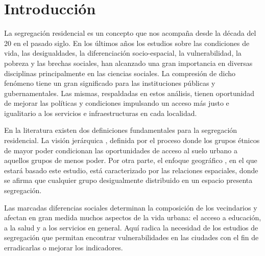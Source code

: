 \chapter*{Introducción}\label{chapter:introduction}

La segregación residencial es un concepto que nos acompaña desde la década del 20 en el pasado siglo. En los últimos años los estudios sobre las condiciones de vida, las desigualdades, la diferenciación socio-espacial, la vulnerabilidad, la pobreza y las brechas sociales, han alcanzado una gran importancia en diversas disciplinas principalmente en las ciencias sociales. La compresión de dicho fenómeno tiene un gran significado para las instituciones públicas y gubernamentales. Las mismas, respaldadas en estos análisis, tienen oportunidad de mejorar las políticas y condiciones impulsando un acceso más justo e igualitario a los servicios e infraestructuras en cada localidad.

En la literatura existen dos definiciones fundamentales para la segregación residencial. La visión jerárquica \cite{Ortega2018LaSR}, definida por el proceso donde los grupos étnicos de mayor poder condicionan las oportunidades de acceso al suelo urbano a aquellos grupos de menos poder. Por otra parte, el enfoque geográfico \cite{Merkel2014QueEY}, en el que estará basado este estudio, está caracterizado por las relaciones espaciales, donde se afirma que cualquier grupo desigualmente distribuido en un espacio presenta segregación.

Las marcadas diferencias sociales determinan la composición de los vecindarios y afectan en gran medida muchos aspectos de la vida urbana: el acceso a educación, a la salud y a los servicios en general. Aquí radica la necesidad de los estudios de segregación que permitan encontrar vulnerabilidades en las ciudades con el fin de erradicarlas o mejorar los indicadores. 

